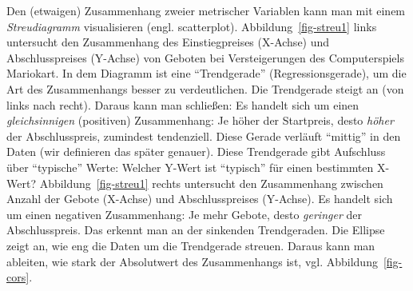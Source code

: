 \documentclass[
  letterpaper,
  twoside,
  open=any]{scrbook}
\theoremstyle{definition}
\theoremstyle{definition}
\theoremstyle{definition}
\theoremstyle{remark}
\begin{document}
Den (etwaigen) Zusammenhang zweier metrischer Variablen kann man mit
einem \emph{Streudiagramm} visualisieren (engl. scatterplot).
Abbildung~\ref{fig-streu1} links untersucht den Zusammenhang des
Einstiegpreises (X-Achse) und Abschlusspreises (Y-Achse) von Geboten bei
Versteigerungen des Computerspiels Mariokart. In dem Diagramm ist eine
\enquote{Trendgerade} (Regressionsgerade), um die Art des Zusammenhangs
besser zu verdeutlichen. Die Trendgerade steigt an (von links nach
recht). Daraus kann man schließen: Es handelt sich um einen
\emph{gleichsinnigen} (positiven) Zusammenhang: Je höher der Startpreis,
desto \emph{höher} der Abschlusspreis, zumindest tendenziell. Diese
Gerade verläuft \enquote{mittig} in den Daten (wir definieren das später
genauer). Diese Trendgerade gibt Aufschluss über \enquote{typische}
Werte: Welcher Y-Wert ist \enquote{typisch} für einen bestimmten X-Wert?
Abbildung~\ref{fig-streu1} rechts untersucht den Zusammenhang zwischen
Anzahl der Gebote (X-Achse) und Abschlusspreises (Y-Achse). Es handelt
sich um einen negativen Zusammenhang: Je mehr Gebote, desto
\emph{geringer} der Abschlusspreis. Das erkennt man an der sinkenden
Trendgeraden. Die Ellipse zeigt an, wie eng die Daten um die Trendgerade
streuen. Daraus kann man ableiten, wie stark der Absolutwert des
Zusammenhangs ist, vgl. Abbildung~\ref{fig-cors}.
\end{document}
